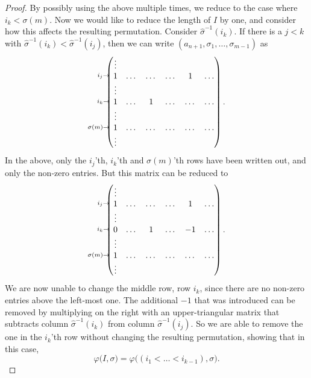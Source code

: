 \begin{proof}
  By possibly using the above multiple times, we reduce to the case
  where $i_k < \sigma(m)$. Now we would like to reduce the length of
  $I$ by one, and consider how this affects the resulting permutation.
  Consider $\widehat\sigma^{-1}(i_k)$. If
  there is a $j < k$ with $\widehat\sigma^{-1}(i_k) <
  \widehat\sigma^{-1}(i_j)$, then we can write
  $(a_{n+1},\sigma_1,\dots,\sigma_{m-1})$ as
  \[\xy
  (-21,11)*{\scriptstyle i_j\to};
  (-21,0.3)*{\scriptstyle i_k\to};
  (-23,-10.5)*{\scriptstyle \sigma(m)\to};
  (5,0)*{\begin{pmatrix}
      \vdots & \\
      1 & \dots & \dots & \dots & 1 & \dots\\
      \vdots \\
      1 & \dots & 1 & \dots & \dots & \dots\\
      \vdots & \\
      1 &  \dots & \dots & \dots & \dots & \dots\\
      \vdots
    \end{pmatrix}.};
  \endxy\]
  In the above, only the $i_j$'th, $i_k$'th and $\sigma(m)$'th rows
  have been written out, and only the non-zero entries. But this
  matrix can be reduced to
  \[\xy
  (-21,11)*{\scriptstyle i_j\to};
  (-21,0.3)*{\scriptstyle i_k\to};
  (-23,-10.5)*{\scriptstyle \sigma(m)\to};
  (5,0)*{\begin{pmatrix}
      \vdots & \\
      1 & \dots & \dots & \dots & 1 & \dots\\
      \vdots \\
      0 & \dots & 1 & \dots & -1 & \dots\\
      \vdots & \\
      1 & \dots & \dots  & \dots & \dots & \dots\\
      \vdots
    \end{pmatrix}.};
  \endxy\]
  We are now unable to change the middle row, row $i_k$, since there
  are no non-zero
  entries above the left-most one. The additional $-1$ that was
  introduced can be removed by multiplying on the right with an
  upper-triangular matrix that subtracts column
  $\widehat\sigma^{-1}(i_k)$
  from column $\widehat\sigma^{-1}(i_j)$. So we are able to remove the
  one in the $i_k$'th row without changing the resulting permutation,
  showing that in this case,
  \[ \varphi\big(I,\sigma\big) =
  \varphi\big((i_1<\dots<i_{k-1}),\sigma\big). \]


\end{proof}
